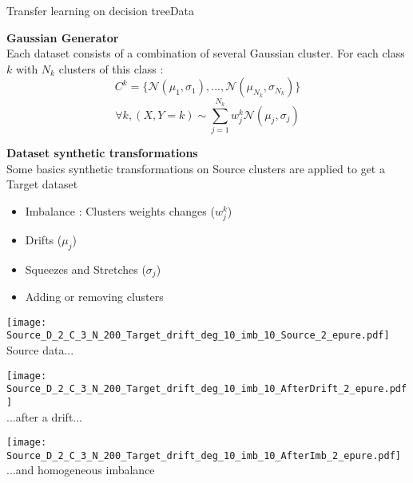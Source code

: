 \begin{frame}{Transfer learning on decision tree}{Data}
    
\textbf{Gaussian Generator}\\
Each dataset consists of a combination of several Gaussian cluster.
For each class $k$ with $N_k$ clusters of this class :
$$ C^k = \{  \mathcal{N}(\mu_1,\sigma_1),..., \mathcal{N}(\mu_{N_k},\sigma_{N_k} )\}$$ 
$$  \forall k, (X,Y = k) \sim \sum_{j=1}^{N_k}  w_j^k \mathcal{N}(\mu_j,\sigma_j)$$

\begin{minipage}[t]{0.49\linewidth}
    \vspace{0pt}
    \textbf{Dataset synthetic transformations}\\
    Some basics synthetic transformations on Source clusters are applied to get a Target dataset
    \begin{itemize}
        \item Imbalance : Clusters weights changes ($ w_j^k$)
        \item Drifts  ($\mu_j$)
        \item Squeezes and Stretches ($\sigma_j$)
        \item Adding or removing clusters
    \end{itemize}
\end{minipage}\hfill
\begin{minipage}[t]{0.49\linewidth}
    \vspace{0pt}
    \renewcommand{\ratio}{0.32}
    \renewcommand{\ratiob}{0.85}
    \begin{minipage}[t]{\ratio\linewidth}\vspace{0pt}
        \centering
        \texttt{[image: Source\_D\_2\_C\_3\_N\_200\_Target\_drift\_deg\_10\_imb\_10\_Source\_2\_epure.pdf]}\\
        {\small Source data...}
    \end{minipage}
    \begin{minipage}[t]{\ratio\linewidth}\vspace{0cm}
        \centering
        \texttt{[image: Source\_D\_2\_C\_3\_N\_200\_Target\_drift\_deg\_10\_imb\_10\_AfterDrift\_2\_epure.pdf]}\\
        {\small ...after a drift...}
    \end{minipage}
    \begin{minipage}[t]{\ratio\linewidth}\vspace{0cm}
        \centering
        \texttt{[image: Source\_D\_2\_C\_3\_N\_200\_Target\_drift\_deg\_10\_imb\_10\_AfterImb\_2\_epure.pdf]}\\
        {\small ...and homogeneous imbalance}
    \end{minipage}
\end{minipage}

\end{frame}

